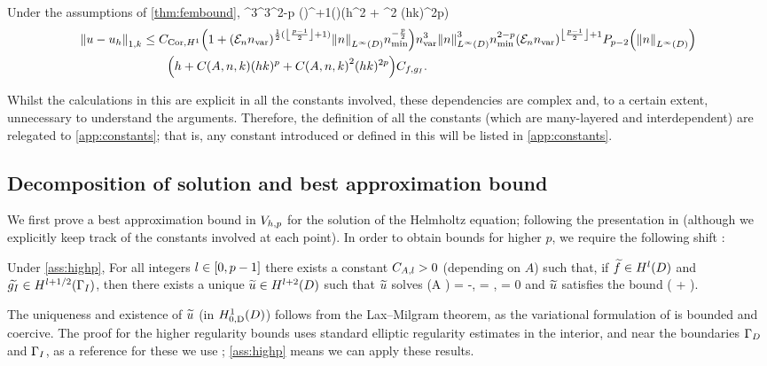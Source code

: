\label{cor:fembound}
Under the assumptions of \cref{thm:fembound},
\beqs
{} \leq \CcorLt \nvar^3^3\nmin^{2-p} \mleft(\En \nvar\mright)^{+1}\mleft(\mright)\mleft(h^2 + \CAnk^2 (hk)^{2p}\mright)\Cfg\tand
\eeqs
\begin{align*}
\NW{u-\uh} &\leq \CcorHo \mleft(1+\mleft(\En\nvar\mright)^{\half(\floor{\frac{p-1}2}+1)}\NLiD{n}\nmin^{-\frac{p}2}\mright)\nvar^3\NLiD{n}^3\nmin^{2-p} \mleft(\En \nvar\mright)^{\floor{\frac{p-1}2}+1}\Pfn{p-2}\mleft(\NLiD{n}\mright)\\
&\quad\quad\mleft(h + \CAnk (hk)^p + \CAnk^2 (hk)^{2p}\mright)\Cfg.
\end{align*}
\eco



Whilst the calculations in this  are explicit in all the constants involved, these dependencies are complex and, to a certain extent, unnecessary to understand the arguments. Therefore, the definition of all the constants (which are many-layered and interdependent) are relegated to \cref{app:constants}; that is, any constant introduced or defined in this  will be listed in \cref{app:constants}.

\subsection{Decomposition of solution and best approximation bound}

We first prove a best approximation bound in $V_{h,p}$ for the solution of the Helmholtz equation; following the presentation in \cite{ChNi:18a} (although we explicitly keep track of the constants involved at each point). In order to obtain bounds for higher $p$, we require the following shift :

\label{thm:shift}
Under \cref{ass:highp}, For all integers $l \in \mleft[0,p-1\mright]$ there exists a constant $C_{A,l}>0$ (depending on $A$) such that, if $\ftilde \in \HlD$ and $\gItilde \in \HlphGI$, then there exists a unique $\utilde \in \HlptD$ such that $\widetilde{u}$ solves
\beqs
\grad \cdot \mleft(A \grad \utilde\mright) = -\ftilde,
\eeqs
\beqs
\dn \utilde = \gItilde, \tand
\eeqs
\beqs
\trD \utilde = 0
\eeqs
and $\widetilde{u}$ satisfies the bound
\beq\label{eq:shift}
\NHlptD{\utilde} \leq \CAl \mleft(\NHlD{\ftilde} + \NHlphGI{\gItilde}\mright).
\eeq
\enth

The uniqueness and existence of $\widetilde{u}$ (in $\HozDD$) follows from the Lax--Milgram theorem, as the variational formulation of is bounded and coercive. The proof for the higher regularity bounds uses standard elliptic regularity estimates in the interior, and near the boundaries $\Gamma_{D}$ and $\Gamma_{I}$, as a reference for these we use \cite[pp. 137-138]{Mc:00}; \cref{ass:highp} means we can apply these results.

